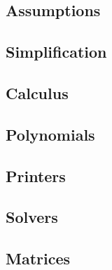 \subsection{Assumptions}
\label{sec:assumptions}


\subsection{Simplification}



\subsection{Calculus}
\label{sec:calculus}


\subsection{Polynomials}


\subsection{Printers}



\subsection{Solvers}


\subsection{Matrices}


